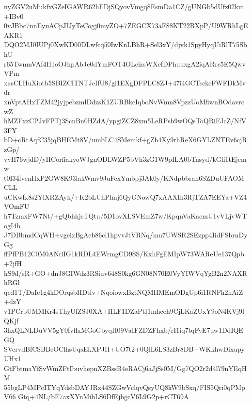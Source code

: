 nyZGV2uMukfxGZeIGAWR62hFDjSQyovVmgq8EsmDa1CZ/gUNGb5dUfz02km+IBv0
0vJBbc7nnEyuACpJIJyTeCogj0myZO+7ZEGCX73aF88KT22BXpP/U9WRhLgEAKR1
DQO2MJ0IUPj0XwKD00DLwfcq50IwKnLBhR+Sel3xY/djvk1SpyHyqUiRlT75SbhU
r65TwnmVAf4H1oOJhpAbJc0dYmFOT4OLeizsWXefDPhuuxgA2iqARrc5E5QwvVPm
xasCLHuXiotb5SBIZClTNTJeIfU8/gi1EXgDFPLC8ZJ+47i4GCTsckcFWFDkMvdr
xnVptAHxTZM42jyjpebzmlDdzsK1ZURBkcIqboNvWmn8VpzzUoMfiwnBOdavrcwZ
hMZFxzCPJvFPTj3ScnBn0HZdA/ypgiZCZ8xm5LeRPsb9wOQsToQRiFJcZ/NfV3FY
bD+cRtAqfC35jqBHEMt8V/umbLC4SMemkf+gZh4Xy9rhReX6GYLZNTEv6cjRzGp/
vyH76wjdD/yHCorfiakyoWJgnODLWZP5bVh3zG1W9pILA0bTnsyd/kGli1tEjemw
t0I34fvenHxP2GW8K93lakWmv9JuFcxYmbpj3Ak0y/KNdpbbran6SZDuUFAOMCLL
uCKwfx8s2YlXRZAyh/+K2bLUhPlmj6QyGNowQ7xAAXIh3RjTZA7EEYa+VZ4VOmFU
h7TzmxFW7Nt/+gQbhhjsTQtu/5D1ovXLSVEmZ7w/KpqnVaKacmU1vVLjvWTogI4b
J7DBbmdCqWH+vgeixBgAeb86cl1hpvvJtVRNq/mu7UWSR2SEzpp4IidFSbrnDyGg
ffPfPB12C0M0ANriIG1kRDL4EWrmgCD9SS/KxhFgEMIpW73WAReUe137Qpb+2jfH
hS9d/sR+GO+dnJ8GIWdz3RSiuv648S0kg6GN08N70E0VyYIWVqYgB2n2NAXRhRGl
qcd1T/DaIe1g4kDOrqsbHDtfv+NqoiowxBztNQMHMEmODgUp6i1RNFh2hAiZ+dzY
v1PCrbUMMKr4sThyUfZSJ0XA+HLF1DZaPtI1mhceh9CjLKaZUxY9oN4KVj9lQKjf
3hxQLNLDuVV5gY0fvflxMGoGbyqH09VaIFZDZFhxb/rI1iq7tqFyE7uw1DdIQEGQ
SVcrvdBfCSBBcOClhsUqsEkXPJH+UO7t2+0QlL6LS3zBr8DB+WKkhwDixupyUHx1
GtFbtmaYfSvWmZFtIbuvhepnXZBssB4eRACj6aJjSs0M/Gg7QO2r2d4l79nYEqHM
55bgLP4MPcITYqYdsbDAYJRx44SZGwVclqvQsyUQ8kW9bSxq/FIS5Qri0qPMpV66
Gtq+4NL/bE7axXYnMibLS6DfEjbgcV6L9G2p+rCT69A=
